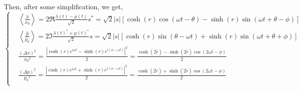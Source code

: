 \documentclass[12pt, twoside]{article}
\begin{document}
Then, after some simplification, we get, 
\begin{equation}
\begin{cases}

&{ \left\langle \frac{\hat{x}}{x_0} \right\rangle =2\Re{\frac{\lambda(t) - \mu(t)}{\sqrt{2}}s^*}=\sqrt{2}|s|[\cosh(r)\cos(\omega t - \theta) - \sinh(r)\sin(\omega t + \theta - \phi)]}\\
&{ \left\langle \frac{\hat{p}}{p_0} \right\rangle =2\Im{\frac{\lambda(t)^* + \mu(t)^*}{\sqrt{2}}s}=\sqrt{2}|s|[\cosh(r)\sin(\theta - \omega t) + \sinh(r)\sin(\omega t + \theta + \phi)]}\\
& { \frac{(\Delta x)^2}{{x_0}^2} = \frac { |\cosh(r)e^{i\omega t} - \sinh(r)e^{i(\phi - \omega t)}|^2 } { 2 } =  \frac{\cosh(2\tilde{r}) - \sinh(2\tilde{r})\cos(2\omega t-\phi) }{2} }\\
& { \frac{(\Delta p)^2}{{p_0}^2} = \frac { |\cosh(r)e^{i\omega t} + \sinh(r)e^{i(\phi - \omega t)}|^2 } { 2 } =  \frac{\cosh(2\tilde{r}) + \sinh(2\tilde{r})\cos(2\omega t-\phi) }{2} }\\

\end{cases}\end{equation}
\end{document}
